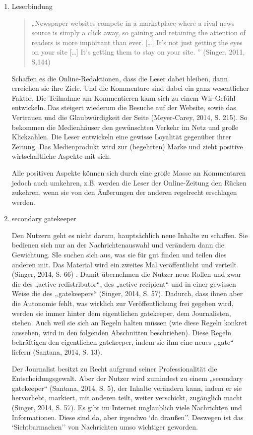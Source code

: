 \begin{enumerate}
\item{Leserbindung}

\begin{quote}
„Newspaper websites compete in a marketplace where a rival news source is simply
a click away, so gaining and retaining the attention of readers is more
important than ever. [\ldots] It’s not just getting the eyes on your site
[\ldots] It’s getting them to stay on your site. ” (Singer, 2011, S.144)
\end{quote}

Schaffen es die Online-Redaktionen, dass die Leser dabei bleiben, dann erreichen
sie ihre Ziele. Und die Kommentare sind dabei ein ganz wesentlicher Faktor. Die
Teilnahme am Kommentieren kann sich zu einem Wir-Gefühl entwickeln. Das steigert
wiederum die Besuche auf der Website, sowie das Vertrauen und die
Glaubwürdigkeit der Seite (Meyer-Carey, 2014, S. 215). So bekommen die
Medienhäuser den gewünschten Verkehr im Netz und große Klickzahlen. Die Leser
entwickeln eine gewisse Loyalität gegenüber ihrer Zeitung. Das Medienprodukt
wird zur (begehrten) Marke und zieht positive wirtschaftliche Aspekte mit sich.

Alle positiven Aspekte können sich durch eine große Masse an Kommentaren jedoch
auch umkehren, z.B. werden die Leser der Online-Zeitung den Rücken zukehren,
wenn sie von den Äußerungen der anderen regelrecht erschlagen werden.


\item{secondary gatekeeper}


Den Nutzern geht es nicht darum, hauptsächlich neue Inhalte zu schaffen. Sie
bedienen sich nur an der Nachrichtenauswahl und verändern dann die Gewichtung. 
SIe suchen sich aus, was sie für gut finden und teilen dies anderen mit. Das Material wird
ein zweites Mal veröffentlicht und verteilt (Singer, 2014, S. 66) .
Damit übernehmen die Nutzer neue Rollen und zwar die des „active redistributor“, des
„active recipient“ und in einer gewissen Weise die des „gatekeepers“ (Singer,
2014, S. 57). Dadurch, dass ihnen aber die Autonomie fehlt, was wirklich zur
Veröffentlichung frei gegeben wird, werden sie immer hinter dem eigentlichen
gatekeeper, dem Journalisten, stehen. Auch weil sie sich an Regeln halten müssen
(wie diese Regeln konkret aussehen, wird in den folgenden Abschnitten
beschrieben). Diese Regeln bekräftigen den eigentlichen gatekeeper, indem sie
ihm eine neues „gate“ liefern (Santana, 2014, S. 13).

Der Journalist besitzt zu Recht aufgrund seiner Professionalität die
Entscheidungsgewalt. Aber der Nutzer wird zumindest zu einem „secondary
gatekeeper“ (Santana, 2014, S. 5), der Inhalte verändern kann, indem er sie
hervorhebt, markiert, mit anderen teilt, weiter verschickt, zugänglich
macht (Singer, 2014, S. 57). 
Es gibt im Internet unglaublich viele Nachrichten und Informationen. Diese sind da,
aber irgendwo \glqq`da draußen''. Deswegen ist das \glqq`Sichtbarmachen'' von Nachrichten
umso wichtiger geworden. 


\end{enumerate}
